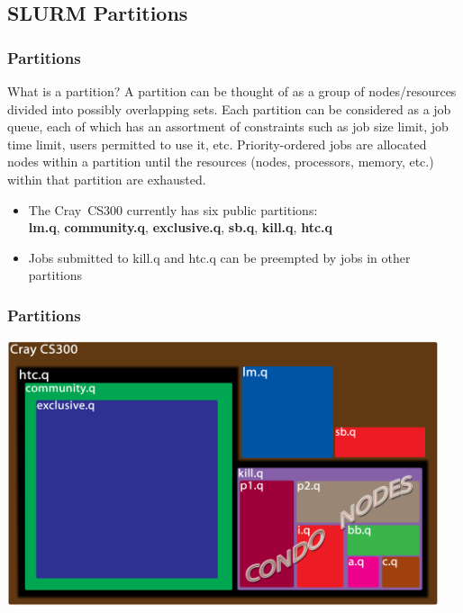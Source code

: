 \documentclass[t,hyperref={pdfpagelabels=false}]{beamer}
\newcommand{\craycs}{Cray~CS300}
\begin{document}
\subsection{SLURM Partitions}
\begin{frame}
\footnotesize
\frametitle{Partitions}
\begin{block}{What is a partition?}\footnotesize
A partition can be thought of as a group of nodes/resources divided into possibly overlapping sets.  Each partition can be considered as a job queue, each of which has an assortment of constraints such as job size limit, job time limit, users permitted to use it, etc. Priority-ordered jobs are allocated nodes within a partition until the resources (nodes, processors, memory, etc.) within that partition are exhausted.\footnotemark
\end{block}
\begin{itemize}
	\item The {\craycs} currently has six public partitions:~\\\textbf{lm.q}, \textbf{community.q}, \textbf{exclusive.q}, \textbf{sb.q}, \textbf{kill.q}, \textbf{htc.q}
	\item Jobs submitted to kill.q and htc.q can be preempted by jobs in other partitions
\end{itemize}
\end{frame}

\begin{frame}
\frametitle{Partitions}
\includegraphics[width=0.95\textwidth]{images/partitions}
\end{frame}
\end{document}
